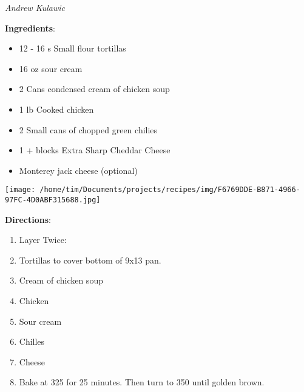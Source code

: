\documentclass[11pt, twoside, openany]{book}
\begin{document}
 \label{green-chille,-chicken-and-cheese-casserole}\hfill\textit{Andrew Kulawic}\\
\begin{minipage}[t]{0.8\linewidth}
\textbf{Ingredients}:\vspace{-3mm}
\begin{multicols}{2}
\begin{itemize}\setlength\itemsep{-1mm}
\item 12 - 16 s Small flour tortillas
\item 16 oz sour cream
\item 2 Cans condensed cream of chicken soup
\item 1 lb Cooked chicken
\item 2 Small cans of chopped green chilies
\item 1 + blocks Extra Sharp Cheddar Cheese
\item Monterey jack cheese (optional)
\end{itemize}
\end{multicols}
\end{minipage}
\begin{minipage}[t]{0.2\linewidth}
\centering \strut\vspace*{-\baselineskip}\newline
\texttt{[image: /home/tim/Documents/projects/recipes/img/F6769DDE-B871-4966-97FC-4D0ABF315688.jpg]}\\
\end{minipage}\vspace{3mm}
\textbf{Directions}:
\vspace{-3mm}\begin{enumerate}\setlength\itemsep{-1mm}
\item Layer Twice:
\item Tortillas to cover bottom of 9x13 pan.
\item Cream of chicken soup
\item Chicken 
\item Sour cream
\item Chilles
\item Cheese
\item Bake at 325 for 25 minutes. Then turn to 350 until golden brown.
\end{enumerate}
 \label{peppermint-bark}\hfill\textit{}\\
\end{document}
